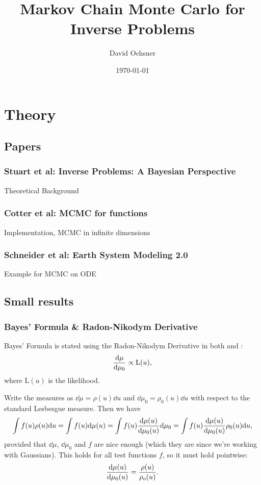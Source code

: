 \documentclass[11pt]{article}
\author{David Ochsner}
\date{\today}
\title{Markov Chain Monte Carlo for Inverse Problems}
\begin{document}
\maketitle
\tableofcontents


\section{Theory}
\label{sec:orgac9a778}
\subsection{Papers}
\label{sec:org4f29f07}
\subsubsection{Stuart et al: Inverse Problems: A Bayesian Perspective \cite{stuart_inverse_2010}}
\label{sec:orgc1ba1d3}
Theoretical Background
\subsubsection{Cotter et al: MCMC for functions \cite{cotter_mcmc_2013}}
\label{sec:org3c89c32}
Implementation, MCMC in infinite dimensions
\subsubsection{Schneider et al: Earth System Modeling 2.0  \cite{schneider_earth_2017}}
\label{sec:org77ea5f6}
Example for MCMC on ODE
\subsection{Small results}
\label{sec:org429d1f2}
\subsubsection{Bayes' Formula \& Radon-Nikodym Derivative}
\label{sec:org76f6132}
Bayes' Formula is stated using the Radon-Nikodym Derivative in both \cite{cotter_mcmc_2013} and \cite{stuart_inverse_2010}:
$$\dv{\mu}{\mu_0} \propto \text{L}(u),$$
where \(\text{L}(u)\) is the likelihood.

Write the measures as \(\dd \mu = \rho(u)\dd u\) and \(\dd \mu_0 = \rho_0(u)\dd u\) with respect
to the standard Lesbesgue measure. Then we have
$$
    \int f(u) \rho(u) \dd u =
    \int f(u) \dd \mu(u) =
    \int f(u) \dv{\mu(u)}{\mu_0(u)} \dd \mu_0 =
    \int f(u) \dv{\mu(u)}{\mu_0(u)} \rho_0(u) \dd u,
    $$
provided that \(\dd \mu\), \(\dd \mu_0\) and \(f\) are nice enough (which they are since we're working
with Gaussians). This holds for all test functions \(f\), so it must hold pointwise:
$$ \dv{\mu(u)}{\mu_0(u)} = \frac{\rho(u)}{\rho_o(u)}.$$
\end{document}
